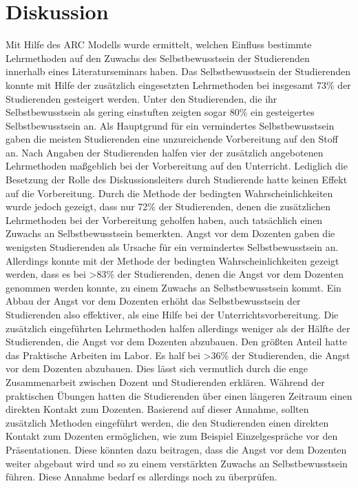 \section{Diskussion}
Mit Hilfe des ARC Modells wurde ermittelt, welchen Einfluss bestimmte Lehrmethoden auf den Zuwachs des Selbstbewusstsein der Studierenden innerhalb eines Literaturseminars haben. Das Selbstbewusstsein der Studierenden konnte mit Hilfe der zusätzlich eingesetzten Lehrmethoden bei insgesamt 73\% der Studierenden gesteigert werden. Unter den Studierenden, die ihr Selbstbewusstsein als gering einstuften zeigten sogar 80\% ein gesteigertes Selbstbewusstsein an. Als Hauptgrund für ein vermindertes Selbstbewusstsein gaben die meisten Studierenden eine unzureichende Vorbereitung auf den Stoff an. Nach Angaben der Studierenden halfen vier der zusätzlich angebotenen Lehrmethoden maßgeblich bei der Vorbereitung auf den Unterricht. Lediglich die Besetzung der Rolle des Diskussionsleiters durch Studierende hatte keinen Effekt auf die Vorbereitung. Durch die Methode der bedingten Wahrscheinlichkeiten wurde jedoch gezeigt, dass nur 72\% der Studierenden, denen die zusätzlichen Lehrmethoden bei der Vorbereitung geholfen haben, auch tatsächlich einen Zuwachs an Selbstbewusstsein bemerkten. Angst vor dem Dozenten gaben die wenigsten Studierenden als Ursache für ein vermindertes Selbstbewusstsein an. Allerdings konnte mit der Methode der bedingten Wahrscheinlichkeiten gezeigt werden, dass es bei >83\% der Studierenden, denen die Angst vor dem Dozenten genommen werden konnte, zu einem Zuwachs an Selbstbewusstsein kommt. Ein Abbau der Angst vor dem Dozenten erhöht das Selbstbewusstsein der Studierenden also effektiver, als eine Hilfe bei der Unterrichtsvorbereitung. Die zusätzlich eingeführten Lehrmethoden halfen allerdings weniger als der Hälfte der Studierenden, die Angst vor dem Dozenten abzubauen. Den größten Anteil hatte das Praktische Arbeiten im Labor. Es half bei >36\% der Studierenden, die Angst vor dem Dozenten abzubauen. Dies lässt sich vermutlich durch die enge Zusammenarbeit zwischen Dozent und Studierenden erklären. Während der praktischen Übungen hatten die Studierenden über einen längeren Zeitraum einen direkten Kontakt zum Dozenten. Basierend auf dieser Annahme, sollten zusätzlich Methoden eingeführt werden, die den Studierenden einen direkten Kontakt zum Dozenten ermöglichen, wie zum Beispiel Einzelgespräche vor den Präsentationen. Diese könnten dazu beitragen, dass die Angst vor dem Dozenten weiter abgebaut wird und so zu einem verstärkten Zuwachs an Selbstbewusstsein führen. Diese Annahme bedarf es allerdings noch zu überprüfen.